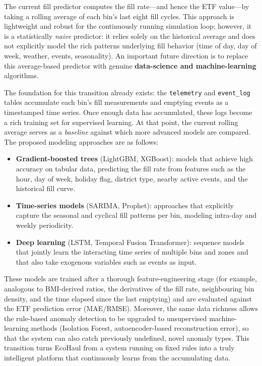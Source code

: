 \documentclass[12pt,a4paper]{report}
\begin{document}
\begin{itemize}[leftmargin=*]
\indent The current fill predictor computes the fill rate---and hence the ETF value---by taking a rolling average of each bin's last eight fill cycles. This approach is lightweight and robust for the continuously running simulation loop; however, it is a statistically \textit{naive} predictor: it relies solely on the historical average and does not explicitly model the rich patterns underlying fill behavior (time of day, day of week, weather, events, seasonality). An important future direction is to replace this average-based predictor with genuine \textbf{data-science and machine-learning} algorithms.

\indent The foundation for this transition already exists: the \texttt{telemetry} and \texttt{event\_log} tables accumulate each bin's fill measurements and emptying events as a timestamped time series. Once enough data has accumulated, these logs become a rich training set for supervised learning. At that point, the current rolling average serves as a \textit{baseline} against which more advanced models are compared. The proposed modeling approaches are as follows:

\begin{itemize}[leftmargin=1.5cm]
  \item \textbf{Gradient-boosted trees} (LightGBM, XGBoost): models that achieve high accuracy on tabular data, predicting the fill rate from features such as the hour, day of week, holiday flag, district type, nearby active events, and the historical fill curve.
  \item \textbf{Time-series models} (SARIMA, Prophet): approaches that explicitly capture the seasonal and cyclical fill patterns per bin, modeling intra-day and weekly periodicity.
  \item \textbf{Deep learning} (LSTM, Temporal Fusion Transformer): sequence models that jointly learn the interacting time series of multiple bins and zones and that also take exogenous variables such as events as input.
\end{itemize}

\indent These models are trained after a thorough feature-engineering stage (for example, analogous to BMI-derived ratios, the derivatives of the fill rate, neighbouring bin density, and the time elapsed since the last emptying) and are evaluated against the ETF prediction error (MAE/RMSE). Moreover, the same data richness allows the rule-based anomaly detection to be upgraded to unsupervised machine-learning methods (Isolation Forest, autoencoder-based reconstruction error), so that the system can also catch previously undefined, novel anomaly types. This transition turns EcoHaul from a system running on fixed rules into a truly intelligent platform that continuously learns from the accumulating data.


\end{itemize}
\end{document}
